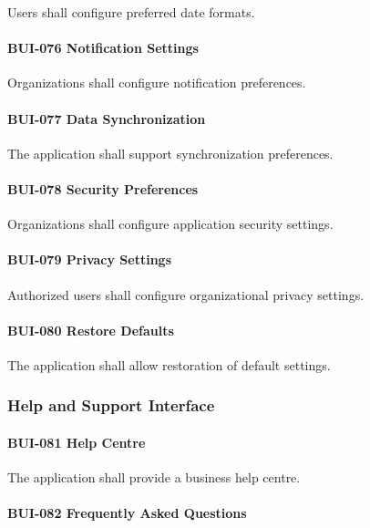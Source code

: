 Users shall configure preferred date formats.

\paragraph{BUI-076 Notification Settings}

Organizations shall configure notification preferences.

\paragraph{BUI-077 Data Synchronization}

The application shall support synchronization preferences.

\paragraph{BUI-078 Security Preferences}

Organizations shall configure application security settings.

\paragraph{BUI-079 Privacy Settings}

Authorized users shall configure organizational privacy settings.

\paragraph{BUI-080 Restore Defaults}

The application shall allow restoration of default settings.


\subsubsection*{Help and Support Interface}

\paragraph{BUI-081 Help Centre}

The application shall provide a business help centre.

\paragraph{BUI-082 Frequently Asked Questions}

